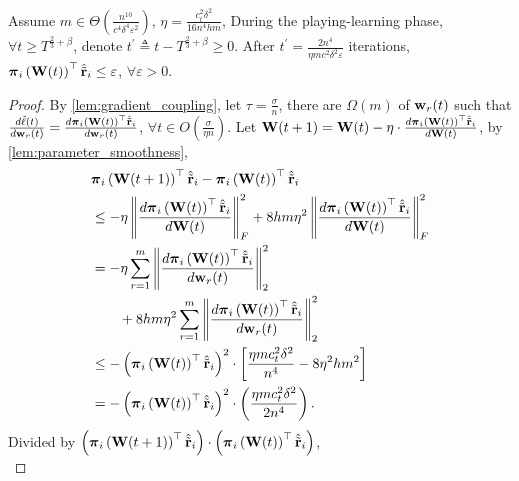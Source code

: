 \begin{thm}
\label{thm:surrogate_expected_loss_convergence}
    Assume $m \in \Theta\left( \frac{n^{10}}{c^4 \delta^4 \varepsilon^2} \right)$, $\eta = \frac{c_t^2 \delta^2}{16 n^4 h m}$, During the playing-learning phase, $\forall t \ge T^{\frac{2}{3} + \beta}$, denote $t^\prime \triangleq t - T^{\frac{2}{3} + \beta} \ge 0$. After $t^\prime = \frac{2n^4}{\eta m c^2 \delta^2 \varepsilon}$ iterations, ${\boldsymbol{\pi}}_i\left( {\mathbf{W}}(t) \right)^\top \hat{{\tilde{\mathbf{r}}}}_i \le \varepsilon$, $\forall \varepsilon > 0$.
\end{thm}
\begin{proof}
    By \cref{lem:gradient_coupling}, let $\tau = \frac{\sigma}{n}$, there are $\Omega\left( m \right)$ of ${\mathbf{w}}_r(t)$ such that $\frac{d\tilde{\ell}(t)}{d {\mathbf{w}}_r(t)} = \frac{d {\boldsymbol{\pi}}_i\left( {\mathbf{W}}(t) \right)^\top \hat{{\tilde{\mathbf{r}}}}_i}{d {\mathbf{w}}_r(t)}$, $\forall t \in O\left( \frac{\sigma}{\eta n} \right)$. Let ${\mathbf{W}}(t+1) = {\mathbf{W}}(t) - \eta \cdot \frac{d {\boldsymbol{\pi}}_i\left( {\mathbf{W}}(t) \right)^\top \hat{{\tilde{\mathbf{r}}}}_i}{d {\mathbf{W}}(t)}$, by \cref{lem:parameter_smoothness},
\begin{equation*}
\begin{split}
    &{\boldsymbol{\pi}}_i\left( {\mathbf{W}}(t+1) \right)^\top \hat{{\tilde{\mathbf{r}}}}_i - {\boldsymbol{\pi}}_i\left( {\mathbf{W}}(t) \right)^\top \hat{{\tilde{\mathbf{r}}}}_i \\
    &\le - \eta \left\| \frac{d {\boldsymbol{\pi}}_i\left( {\mathbf{W}}(t) \right)^\top \hat{{\tilde{\mathbf{r}}}}_i}{d {\mathbf{W}}(t)} \right\|_F^2 + 8 h m \eta^2 \left\| \frac{d {\boldsymbol{\pi}}_i\left( {\mathbf{W}}(t) \right)^\top \hat{{\tilde{\mathbf{r}}}}_i}{d {\mathbf{W}}(t)} \right\|_F^2 \\
    &= - \eta \sum\limits_{r=1}^{m}{ \left\| \frac{d {\boldsymbol{\pi}}_i\left( {\mathbf{W}}(t) \right)^\top \hat{{\tilde{\mathbf{r}}}}_i}{d {\mathbf{w}}_r(t)} \right\|_2^2 } \\
    &\qquad + 8 h m \eta^2 \sum\limits_{r=1}^{m}{ \left\| \frac{d {\boldsymbol{\pi}}_i\left( {\mathbf{W}}(t) \right)^\top \hat{{\tilde{\mathbf{r}}}}_i}{d {\mathbf{w}}_r(t)} \right\|_2^2 } \\
    &\le - \left( {\boldsymbol{\pi}}_i\left( {\mathbf{W}}(t) \right)^\top \hat{{\tilde{\mathbf{r}}}}_i \right)^2 \cdot \left[ \frac{\eta m c_t^2 \delta^2}{n^4} - 8 \eta^2 h m^2 \right] \\
    &= - \left( {\boldsymbol{\pi}}_i\left( {\mathbf{W}}(t) \right)^\top \hat{{\tilde{\mathbf{r}}}}_i \right)^2 \cdot \left( \frac{\eta m c_t^2 \delta^2}{2n^4} \right).
\end{split}
\end{equation*}
Divided by $\left( {\boldsymbol{\pi}}_i\left( {\mathbf{W}}(t+1) \right)^\top \hat{{\tilde{\mathbf{r}}}}_i\right) \cdot \left( {\boldsymbol{\pi}}_i\left( {\mathbf{W}}(t) \right)^\top \hat{{\tilde{\mathbf{r}}}}_i \right)$,
\begin{equation*}

\end{equation*}
\end{proof}
